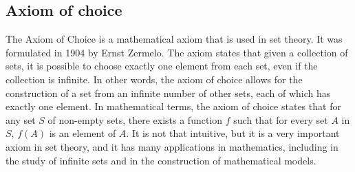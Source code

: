 \documentclass{article}
\begin{document}
\subsection{Axiom of choice}
The Axiom of Choice is a mathematical axiom that is used in set theory.
It was formulated in 1904 by Ernst Zermelo. The axiom states that given a collection of sets, it is possible to choose exactly one element from each set, even if the collection is infinite. In other words, the axiom of choice allows for the construction of a set from an infinite number of other sets, each of which has exactly one element.
In mathematical terms, the axiom of choice states that for any set \( S \) of non-empty sets, there exists a function \( f \) such that for every set \( A \) in \( S \), \( f(A) \) is an element of \( A \).
It is not that intuitive, but it is a very important axiom in set theory, and it has many applications in mathematics, including in the study of infinite sets and in the construction of mathematical models.






\newpage





\end{document}
